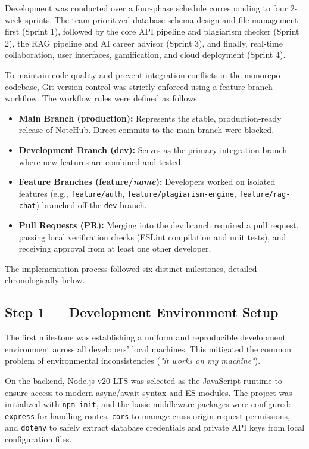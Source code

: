\documentclass[12,Times new Roman,a4paper]{report}
\begin{document}
Development was conducted over a four-phase schedule corresponding to four 2-week sprints. The team prioritized database schema design and file management first (Sprint 1), followed by the core API pipeline and plagiarism checker (Sprint 2), the RAG pipeline and AI career advisor (Sprint 3), and finally, real-time collaboration, user interfaces, gamification, and cloud deployment (Sprint 4).

To maintain code quality and prevent integration conflicts in the monorepo codebase, Git version control was strictly enforced using a feature-branch workflow. The workflow rules were defined as follows:
\begin{itemize}
    \item \textbf{Main Branch (production):} Represents the stable, production-ready release of NoteHub. Direct commits to the main branch were blocked.
    \item \textbf{Development Branch (dev):} Serves as the primary integration branch where new features are combined and tested.
    \item \textbf{Feature Branches (feature/\textit{name}):} Developers worked on isolated features (e.g., \texttt{feature/auth}, \texttt{feature/plagiarism-engine}, \texttt{feature/rag-chat}) branched off the \texttt{dev} branch.
    \item \textbf{Pull Requests (PR):} Merging into the dev branch required a pull request, passing local verification checks (ESLint compilation and unit tests), and receiving approval from at least one other developer.
\end{itemize}

The implementation process followed six distinct milestones, detailed chronologically below.

\subsection{Step 1 — Development Environment Setup}

The first milestone was establishing a uniform and reproducible development environment across all developers' local machines. This mitigated the common problem of environmental inconsistencies (\textit{"it works on my machine"}).

On the backend, Node.js v20 LTS was selected as the JavaScript runtime to ensure access to modern async/await syntax and ES modules. The project was initialized with \texttt{npm init}, and the basic middleware packages were configured: \texttt{express} for handling routes, \texttt{cors} to manage cross-origin request permissions, and \texttt{dotenv} to safely extract database credentials and private API keys from local configuration files.
\end{document}
